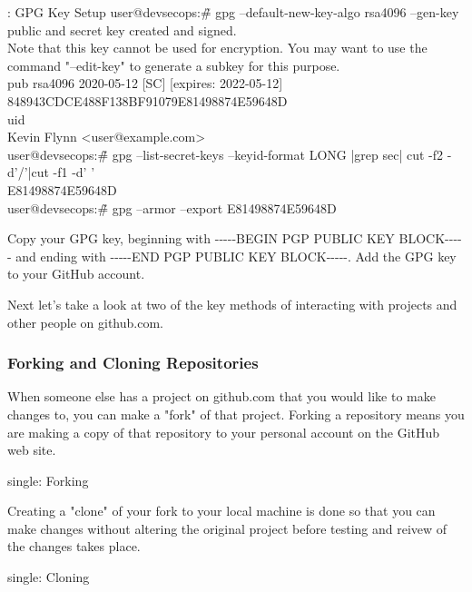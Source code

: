 \begin{mybox}{\thetcbcounter: GPG Key Setup}
user@devsecops:\~\# gpg --default-new-key-algo rsa4096 --gen-key\\
public and secret key created and signed.\\
Note that this key cannot be used for encryption.  You may want to use
the command "--edit-key" to generate a subkey for this purpose.\\
pub   rsa4096 2020-05-12 [SC] [expires: 2022-05-12]\\
\hspace*{15mm}      848943CDCE488F138BF91079E81498874E59648D\\
uid\\
\hspace*{25mm}                     Kevin Flynn <user@example.com>\\

user@devsecops:\~\# gpg --list-secret-keys --keyid-format LONG |grep sec| cut -f2 -d'/'|cut -f1 -d' '\\
E81498874E59648D\\
user@devsecops:\~\# gpg --armor --export E81498874E59648D
\end{mybox}

Copy your GPG key, beginning with
-\/-\/-\/-\/-BEGIN PGP PUBLIC KEY BLOCK-\/-\/-\/-\/- and ending with
-\/-\/-\/-\/-END PGP PUBLIC KEY BLOCK-\/-\/-\/-\/-. Add the GPG key to
your GitHub account.

Next let's take a look at two of the key methods of interacting with
projects and other people on github.com.

\hypertarget{forking-and-cloning-repositories}{%
\subsubsection{Forking and Cloning
Repositories}\label{forking-and-cloning-repositories}}

When someone else has a project on github.com that you would like to
make changes to, you can make a "fork" of that project. Forking a
repository means you are making a copy of that repository to your
personal account on the GitHub web site.

single: Forking

Creating a "clone" of your fork to your local machine is done so that
you can make changes without altering the original project before
testing and reivew of the changes takes place.

single: Cloning


